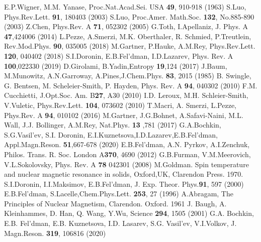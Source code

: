 \documentclass[preprint,12pt]{elsarticle}
\begin{document}



\begin{thebibliography}{20}
   E.P.Wigner, M.M. Yanase, Proc.Nat.Acad.Sei. USA \textbf{49}, 910-918 (1963)
   S.Luo, Phys.Rev.Lett. \textbf{91}, 180403 (2003)
   S.Luo, Proc.Amer. Math.Soc. \textbf{132}, No.885-890 (2003)
   Z.Chen, Phys.Rev. A \textbf{71}, 052302 (2005)
   G.Toth, I.Apellaniz, J. Phys. A \textbf{47},424006 (2014)
   L.Pezze, A.Smerzi, M.K. Oberthaler, R. Schmied, P.Treutlein, Rev.Mod.Phys. \textbf{90}, 035005 (2018)
   M.Gartner, P.Hauke, A.M.Rey, Phys.Rev.Lett. \textbf{120}, 040402 (2018)
   S.I.Doronin, E.B.Fel'dman, I.D.Lazarev, Phys. Rev. A \textbf{100},022330 (2019)
   D.Girolami, B.Yadin,Entropy \textbf{19},124 (2017)
   J.Baum, M.Munowitz, A.N.Garroway, A.Pines,J.Chem.Phys. \textbf{83}, 2015 (1985)
   B. Swingle, G. Bentsen, M. Scheleier-Smith, P. Hayden, Phys.	Rev. A \textbf{94}, 040302 (2010)
   F.M. Cucchietti, J.Opt.Soc. Am. B\textbf{27}, A30 (2010)
   I.D. Leroux, M.H. Schleier-Smith, V.Vuletic, Phys.Rev.Lett. \textbf{104}, 073602 (2010)
   T.Macri, A. Smerzi, L.Pezze, Phys.Rev. A \textbf{94}, 010102 (2016)
   M.Gartner, J.G.Bohnet, A.Safavi-Naini, M.L. Wall, J.J. Bollinger, A.M.Rey, Nat.Phys. \textbf{13} ,781 (2017)
   G.A.Bochkin, S.G.Vasil'ev, S.I. Doronin, E.I.Kuznetsova,I.D.Lazarev,E.B.Fel'dman, Appl.Magn.Reson. \textbf{51},667-678 (2020)
   E.B.Fel'dman, A.N. Pyrkov, A.I.Zenchuk, Philos. Trans. R. Soc. London A\textbf{370}, 4690 (2012)
   G.B.Furman, V.M.Meerovich, V.L.Sokolovsky, Phys. Rev. A \textbf{78} 042301 (2008)
   M.Goldman. Spin temperature and nuclear magnetic resonance in solids, Oxford,UK, Clarendon Press. 1970.
   S.I.Doronin, I.I.Maksimov, E.B.Fel’dman, J. Exp. Theor. Phys.\textbf{91}, 597 (2000)
   E.B.Fel'dman, S.Lacelle,Chem.Phys.Lett. \textbf{253}, 27 (1996)
   A.Abragam, The Principles of Nuclear Magnetism, Clarendon. Oxford. 1961
   J. Baugh, A. Kleinhammes, D. Han, Q. Wang, Y.Wu, Science \textbf{294}, 1505 (2001)
   G.A. Bochkin, E.B. Fel'dman, E.B. Kuznetsova, I.D. Lasarev, S.G. Vasil'ev, V.I.Volkov, J. Magn.Reson. \textbf{319}, 106816 (2020)
\end{thebibliography}
\end{document}
